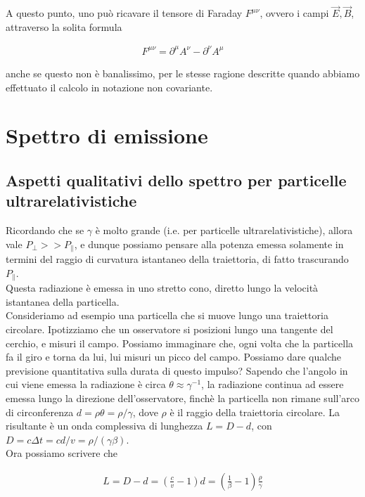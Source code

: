 \documentclass{report}
\begin{document}
A questo punto, uno può ricavare il tensore di Faraday \(F^{\mu\nu}\), ovvero i campi \(\vec{E}, \vec{B}\), attraverso la solita formula 

\begin{align}
    F^{\mu\nu} = \partial^\mu A^\nu - \partial^\nu A^\mu
\end{align}

anche se questo non è banalissimo, per le stesse ragione descritte quando abbiamo effettuato il calcolo in notazione non covariante. 

\section{Spettro di emissione}

\subsection{Aspetti qualitativi dello spettro per particelle ultrarelativistiche}

Ricordando che se \(\gamma\) è molto grande (i.e. per particelle ultrarelativistiche), allora vale \(P_{\perp} >> P_{\parallel}\), e dunque possiamo pensare alla potenza emessa solamente in termini del raggio di curvatura istantaneo della traiettoria, di fatto trascurando \(P_{\parallel}\). \\

Questa radiazione è emessa in uno stretto cono, diretto lungo la velocità istantanea della particella. \\

Consideriamo ad esempio una particella che si muove lungo una traiettoria circolare. Ipotizziamo che un osservatore si posizioni lungo una tangente del cerchio, e misuri il campo. Possiamo immaginare che, ogni volta che la particella fa il giro e torna da lui, lui misuri un picco del campo. Possiamo dare qualche previsione quantitativa sulla durata di questo impulso? Sapendo che l'angolo in cui viene emessa la radiazione è circa \(\theta \approx \gamma^{-1}\), la radiazione continua ad essere emessa lungo la direzione dell'osservatore, finchè la particella non rimane sull'arco di circonferenza \(d = \rho \theta = \rho /\gamma\), dove \(\rho\) è il raggio della traiettoria circolare. La risultante è un onda complessiva di lunghezza \( L = D -d\), con \(D = c\Delta t = cd/v = \rho/(\gamma\beta)\).  \\

Ora possiamo scrivere che 

\begin{align}
    L = D - d = \left(\frac{c}{v} -1\right)d = \left(\frac{1}{\beta} -1\right)\frac{\rho}{\gamma}
\end{align}
\end{document}
